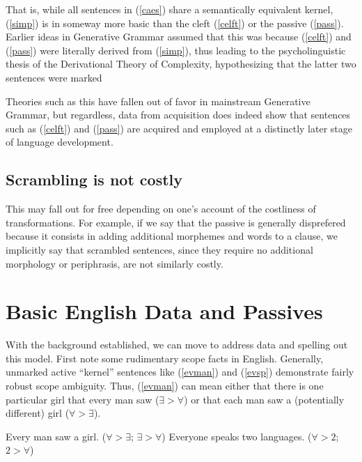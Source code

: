 \documentclass{article}
\begin{document}
That is, while all sentences in (\ref{caes}) share a semantically equivalent kernel, (\ref{simp}) is in someway more basic than the cleft (\ref{celft}) or the passive (\ref{pass}).
Earlier ideas in Generative Grammar assumed that this was because (\ref{celft}) and (\ref{pass}) were literally derived from (\ref{simp}), thus leading to the psycholinguistic thesis of the Derivational Theory of Complexity, hypothesizing that the latter two sentences were marked

Theories such as this have fallen out of favor in mainstream Generative Grammar, but regardless, data from acquisition does indeed show that sentences such as (\ref{celft}) and (\ref{pass}) are acquired and employed at a distinctly later stage of language development.


\subsection{Scrambling is not costly}

This may fall out for free depending on one's account of the costliness of transformations.
For example, if we say that the passive is generally disprefered because it consists in adding additional morphemes and words to a clause, we implicitly say that scrambled sentences, since they require no additional morphology or periphrasis, are not similarly costly.

\section{Basic English Data and Passives\label{eng}}

With the background established, we can move to address data and spelling out this model.
First note some rudimentary scope facts in English.
Generally, unmarked active ``kernel'' sentences like (\ref{evman}) and (\ref{evsp}) demonstrate fairly robust scope ambiguity.
Thus, (\ref{evman}) can mean either that there is one particular girl that every man saw ($\exists>\forall$) or that each man saw a (potentially different) girl ($\forall>\exists$).

\begin{exe}
\ex\label{first}{\begin{xlist}
\ex Every man saw a girl. \hfill ($\forall > \exists$; $\exists >  \forall$)\label{evman}
\ex Everyone speaks two languages. \hfill ($\forall > 2$; $2 > \forall$)\label{evsp}
\end{xlist}}
\end{exe}
\end{document}
